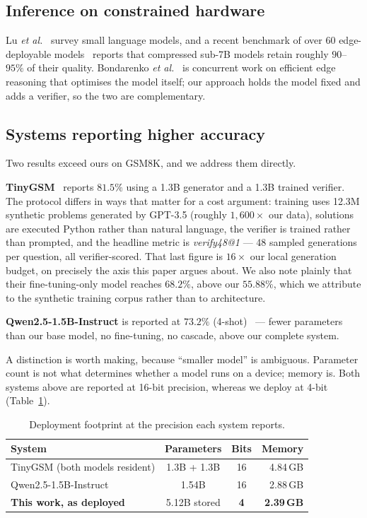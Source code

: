 \documentclass[conference]{IEEEtran}
\begin{document}
\subsection{Inference on constrained hardware}

Lu \textit{et al.}~\cite{lu2024smallsurvey} survey small language models, and a recent
benchmark of over 60 edge-deployable models~\cite{unified2026deployment} reports that
compressed sub-7B models retain roughly $90$--$95\%$ of their quality. Bondarenko
\textit{et al.}~\cite{bondarenko2026edge} is concurrent work on efficient edge reasoning
that optimises the model itself; our approach holds the model fixed and adds a verifier,
so the two are complementary.

\subsection{Systems reporting higher accuracy}
\label{sec:higher}

Two results exceed ours on GSM8K, and we address them directly.

\textbf{TinyGSM}~\cite{liu2023tinygsm} reports $81.5\%$ using a 1.3B generator and a 1.3B
trained verifier. The protocol differs in ways that matter for a cost argument: training
uses 12.3M synthetic problems generated by GPT-3.5 (roughly $1{,}600\times$ our data),
solutions are executed Python rather than natural language, the verifier is trained rather
than prompted, and the headline metric is \emph{verify48@1} --- 48 sampled generations per
question, all verifier-scored. That last figure is $16\times$ our local generation budget,
on precisely the axis this paper argues about. We also note plainly that their
fine-tuning-only model reaches $68.2\%$, above our $55.88\%$, which we attribute to the
synthetic training corpus rather than to architecture.

\textbf{Qwen2.5-1.5B-Instruct} is reported at $73.2\%$ (4-shot)~\cite{qwen2024qwen25} ---
fewer parameters than our base model, no fine-tuning, no cascade, above our complete
system.

A distinction is worth making, because ``smaller model'' is ambiguous. Parameter count is
not what determines whether a model runs on a device; memory is. Both systems above are
reported at 16-bit precision, whereas we deploy at 4-bit (Table~\ref{tab:footprint}).

\begin{table}[t]
\caption{Deployment footprint at the precision each system reports.}
\label{tab:footprint}
\centering
\begin{tabular}{@{}lccr@{}}
\toprule
System & Parameters & Bits & Memory \\
\midrule
TinyGSM (both models resident) & 1.3B + 1.3B & 16 & 4.84\,GB \\
Qwen2.5-1.5B-Instruct & 1.54B & 16 & 2.88\,GB \\
\textbf{This work, as deployed} & 5.12B stored & \textbf{4} & \textbf{2.39\,GB} \\
\bottomrule
\end{tabular}
\end{table}
\end{document}
